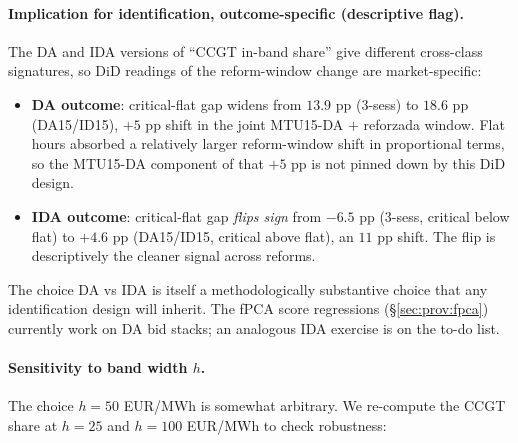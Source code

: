 \documentclass[11pt,a4paper]{article}
\begin{document}
\paragraph{Implication for identification, outcome-specific (descriptive flag).} The DA and IDA versions of ``CCGT in-band share'' give different cross-class signatures, so DiD readings of the reform-window change are market-specific:
\begin{itemize}
\item \textbf{DA outcome}: critical-flat gap widens from $13.9$ pp (3-sess) to $18.6$ pp (DA15/ID15), $+5$ pp shift in the joint MTU15-DA $+$ reforzada window. Flat hours absorbed a relatively larger reform-window shift in proportional terms, so the MTU15-DA component of that $+5$ pp is not pinned down by this DiD design.
\item \textbf{IDA outcome}: critical-flat gap \emph{flips sign} from $-6.5$ pp (3-sess, critical below flat) to $+4.6$ pp (DA15/ID15, critical above flat), an $11$ pp shift. The flip is descriptively the cleaner signal across reforms.
\end{itemize}
The choice DA vs IDA is itself a methodologically substantive choice that any identification design will inherit. The fPCA score regressions (\S\ref{sec:prov:fpca}) currently work on DA bid stacks; an analogous IDA exercise is on the to-do list.

\paragraph{Sensitivity to band width $h$.} The choice $h = 50$ EUR/MWh is somewhat arbitrary. We re-compute the CCGT share at $h = 25$ and $h = 100$ EUR/MWh to check robustness:

\begin{table}[H]
\centering\scriptsize
\caption{\textbf{CCGT in-band share by band half-width $h$ (DA).} Columns 25/50/100: share (\%) of CCGT offered MW within $[\text{MCP}-h, \text{MCP}+h]$. Last two columns: ratio of consecutive bands ($h_2/h_1$). A uniform spread of bid mass across the price domain would give ratios close to $2.0$; observed ratios mostly in $1.4$--$2.0$ → bids are roughly evenly spread between $h = 25$ and $h = 100$.}
\label{tab:bidshape_da_h_sensitivity}
\setlength{\tabcolsep}{4pt}

\end{table}
\end{document}
